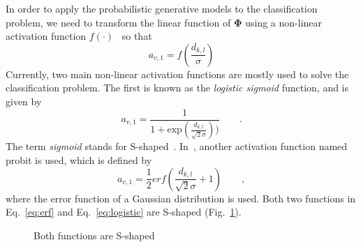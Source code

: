 In order to apply the probabilistic generative models to the
classification problem,
we need to transform the linear function of $\mathbf{\Phi}$ using a
non-linear activation function $f(\cdot)$~\cite{bishop2006pattern} so that 
\begin{equation}
  \label{eq:nonla}
  a_{v,1} = f(\frac{d_{k,l}}{\sigma})
\end{equation}
Currently, two main non-linear activation functions are mostly used
to solve the classification problem. The first is known as the
\textit{logistic sigmoid} function, and is given by
\begin{equation}
  \label{eq:logistic}
  a_{v,1} =
  \frac{1}{1+\mathrm{exp}(\frac{d_{k,l}}{\sqrt{2}\sigma}))}\qquad .
\end{equation}
The term \textit{sigmoid} stands for
S-shaped~\cite{bishop2006pattern}. In~\cite{hanek2004contracting},
another activation function named probit is used, which is defined by
\begin{equation}
  \label{eq:erf}
  a_{v,1} = \frac{1}{2}erf(\frac{d_{k,l}}{\sqrt{2}\sigma} + 1)\qquad ,
\end{equation}
where the error function of a Gaussian distribution is used. Both
two functions in Eq.~\ref{eq:erf} and Eq.~\ref{eq:logistic} are
S-shaped (Fig.~\ref{fig:s-shaped}).
\begin{figure} 
  \begin{minipage}[t]{0.5\linewidth} 
    \centering 
  \end{minipage}%
  \begin{minipage}[t]{0.5\linewidth} 
    \centering 
  \end{minipage} 
\caption[Logistic sigmoid function and error function]{Both functions
  are S-shaped}
\label{fig:s-shaped}
\end{figure}

